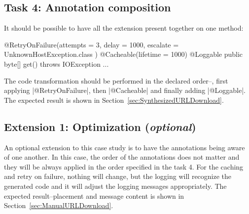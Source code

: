 \subsection{Task 4: Annotation composition}

It should be possible to have all the extension present together on one method:
%
\begin{javacode}
@RetryOnFailure(attempts = 3, delay = 1000, escalate = { UnknownHostException.class })
@Cacheable(lifetime = 1000)
@Loggable
public byte[] get() throws IOException { ... }
\end{javacode}

The code transformation should be performed in the declared order--\Ie, first applying \javainline|@RetryOnFailure|, then \javainline|@Cacheable| and finally adding \javainline|@Loggable|.
The expected result is shown in Section~\ref{sec:SynthesizedURLDownload}.

\subsection{Extension 1: Optimization (\emph{optional})}

An optional extension to this case study is to have the annotations being aware of one another.
In this case, the order of the annotations does not matter and they will be always applied in the order specified in the task 4.
For the caching and retry on failure, nothing will change, but the logging will recognize the generated code and it will adjust the logging messages appropriately.
The expected result--\Ie placement and message content is shown in Section~\ref{sec:ManualURLDownload}.